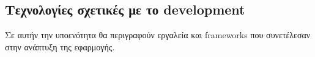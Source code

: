 \subsection{Τεχνολογίες σχετικές με το development}

Σε αυτήν την υποενότητα θα περιγραφούν εργαλεία και frameworks που συνετέλεσαν στην ανάπτυξη της εφαρμογής.

